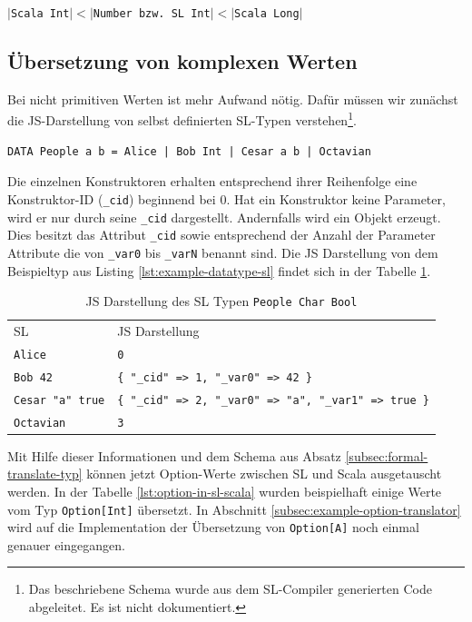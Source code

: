 \documentclass[12pt,bibtotoc]{scrreprt}
\begin{document}
\begin{center}
$|$\lstinline!Scala Int!$| < |$\lstinline!Number bzw. SL Int!$| < |$\lstinline!Scala Long!$|$
\end{center}

\subsection{Übersetzung von komplexen Werten}

Bei nicht primitiven Werten ist mehr Aufwand nötig. Dafür müssen wir zunächst die JS-Darstellung von selbst definierten SL-Typen verstehen\footnote{Das beschriebene Schema wurde aus dem SL-Compiler generierten Code abgeleitet. Es ist nicht dokumentiert.}.

\begin{lstlisting}[caption=Beispiel eines selbstedefinierten Typs, label=lst:example-datatype-sl]
DATA People a b = Alice | Bob Int | Cesar a b | Octavian
\end{lstlisting}

Die einzelnen Konstruktoren erhalten entsprechend ihrer Reihenfolge eine Konstruktor-ID (\lstinline!_cid!) beginnend bei $0$. Hat ein Konstruktor keine Parameter, wird er nur durch seine \lstinline!_cid! dargestellt. Andernfalls wird ein Objekt erzeugt. Dies besitzt das Attribut \lstinline!_cid! sowie entsprechend der Anzahl der Parameter Attribute die von \lstinline!_var0! bis \lstinline!_varN! benannt sind. Die JS Darstellung von dem Beispieltyp aus Listing \ref{lst:example-datatype-sl} findet sich in der Tabelle \ref{tab:js-code-of-people}.

\begin{table}[h]
\caption{JS Darstellung des \ac{SL} Typen \lstinline!People Char Bool!}
\centering
\begin{tabular}{ll}
 \ac{SL}              &  \ac{JS} Darstellung \\
\lstinline!Alice!           &  \lstinline!0! \\
\lstinline!Bob 42!          &  \lstinline!{ "_cid" => 1, "_var0" => 42 }! \\
\lstinline!Cesar "a" true!  &  \lstinline!{ "_cid" => 2, "_var0" => "a", "_var1" => true }! \\
\lstinline!Octavian!        &  \lstinline!3! \\
\end{tabular}
\label{tab:js-code-of-people}
\end{table}

Mit Hilfe dieser Informationen und dem Schema aus Absatz \ref{subsec:formal-translate-typ} können jetzt Option-Werte zwischen SL und Scala ausgetauscht werden. In der Tabelle \ref{lst:option-in-sl-scala} wurden beispielhaft einige Werte vom Typ \lstinline!Option[Int]! übersetzt. In Abschnitt \ref{subsec:example-option-translator} wird auf die Implementation der Übersetzung von \lstinline!Option[A]! noch einmal genauer eingegangen.
\end{document}
